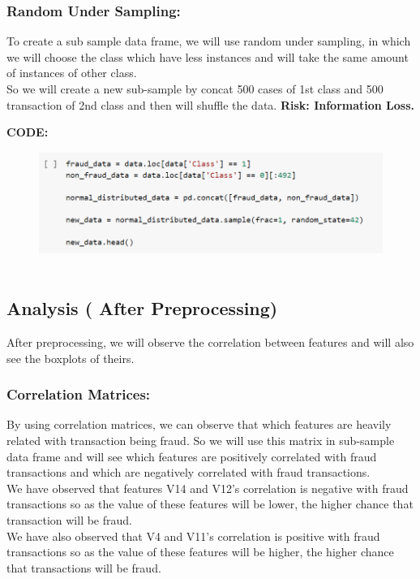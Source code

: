 \documentclass{article}
\begin{document}

\subsubsection{Random Under Sampling:}
To create a sub sample data frame, we will use random under sampling, in which we will choose the class which have less instances and will take the same amount of instances of other class.\\
So we will create a new sub-sample by concat 500 cases of 1st class and 500 transaction of 2nd class and then will shuffle the data. \textbf{Risk: Information Loss.}

\noindent\textbf{CODE:}
\begin{figure}[!h]
\centering
\includegraphics[width = 3.5 in]{img16.png}~
\end{figure}


\subsection{Analysis ( After Preprocessing) }

After preprocessing, we will observe the correlation between features and will also see the boxplots of theirs.

\subsubsection{Correlation Matrices:}
By using correlation matrices, we can observe that which features are heavily related with transaction being fraud. So we will use this matrix in sub-sample data frame and will see which features are positively correlated with fraud transactions and which are negatively correlated with fraud transactions.\\
We have observed that features V14 and V12's correlation is negative with fraud transactions so as the value of these features will be lower, the higher chance that transaction will be fraud.\\
We have also observed that V4 and V11's correlation is positive with fraud transactions so as the value of these features will be higher, the higher chance that transactions will be fraud.
\end{document}
